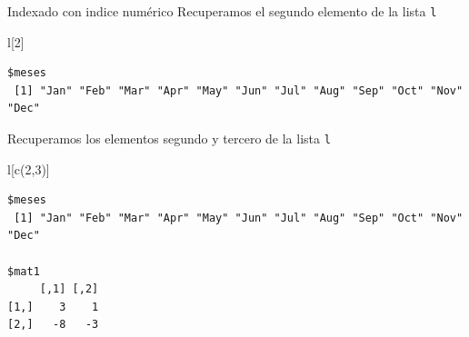 \documentclass[
  ignorenonframetext,
  aspectratio=169,
  spanish,
]{beamer}
\newenvironment{Shaded}{\begin{snugshade}}{\end{snugshade}}
\newcommand{\DecValTok}[1]{\textcolor[rgb]{0.68,0.00,0.00}{#1}}
\newcommand{\FunctionTok}[1]{\textcolor[rgb]{0.28,0.35,0.67}{#1}}
\newcommand{\NormalTok}[1]{\textcolor[rgb]{0.00,0.23,0.31}{#1}}
\begin{document}
\begin{frame}[fragile]{Indexado con indice numérico}
\label{indexado-con-indice-numuxe9rico}
Recuperamos el segundo elemento de la lista \texttt{l}

\begin{Shaded}
\begin{Highlighting}[]
\NormalTok{l[}\DecValTok{2}\NormalTok{]  }
\end{Highlighting}
\end{Shaded}

\begin{verbatim}
$meses
 [1] "Jan" "Feb" "Mar" "Apr" "May" "Jun" "Jul" "Aug" "Sep" "Oct" "Nov" "Dec"
\end{verbatim}

Recuperamos los elementos segundo y tercero de la lista \texttt{l}

\begin{Shaded}
\begin{Highlighting}[]
\NormalTok{l[}\FunctionTok{c}\NormalTok{(}\DecValTok{2}\NormalTok{,}\DecValTok{3}\NormalTok{)]  }
\end{Highlighting}
\end{Shaded}

\begin{verbatim}
$meses
 [1] "Jan" "Feb" "Mar" "Apr" "May" "Jun" "Jul" "Aug" "Sep" "Oct" "Nov" "Dec"

$mat1
     [,1] [,2]
[1,]    3    1
[2,]   -8   -3
\end{verbatim}
\end{frame}
\end{document}
